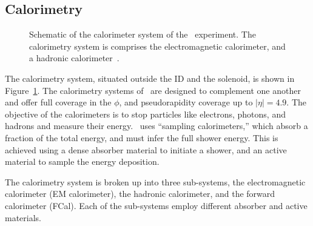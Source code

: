 \FloatBarrier
\subsection{Calorimetry} 
\label{sec:calo}

\begin{figure}[ht]
  \caption[
    Schematic of the calorimeter system of the
    \atlas\ experiment~\cite{cern-jinst-atlas}.
  ]{
    Schematic of the calorimeter system of the
    \atlas\ experiment.
    The calorimetry system is comprises the electromagnetic calorimeter,
    and a hadronic calorimeter~\cite{cern-jinst-atlas}.
  }
  \label{fig:calo_cartoon}
\end{figure}

The calorimetry system, situated outside the ID and the solenoid, is shown
in Figure~\ref{fig:calo_cartoon}.
The calorimetry systems of \atlas\ are designed to complement one another and
offer full coverage in the $\phi$, and pseudorapidity coverage up to
$|\eta| = 4.9$.
The objective of the calorimeters is to stop particles like electrons, photons,
and hadrons and measure their energy.
\atlas\ uses ``sampling calorimeters,'' which absorb a fraction of the total
energy, and must infer the full shower energy.
This is achieved using a dense absorber material to initiate a shower, and
an active material to sample the energy deposition.

The calorimetry system is broken up into three sub-systems, the electromagnetic
calorimeter (EM calorimeter), the hadronic calorimeter, and the forward
calorimeter (FCal).
Each of the sub-systems employ different absorber and active materials.

